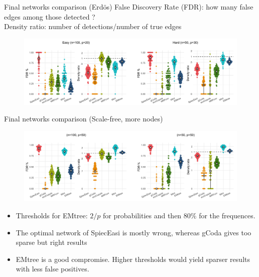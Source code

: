 \documentclass[11pt]{beamer}
\newcommand{\bleu}[1]{\textcolor{Framableulight}{#1}}
\begin{document}
  \begin{frame}{Final networks comparison (Erdös)}
 \small{ \bleu{False Discovery Rate (FDR):} how many false edges among those detected ?\\
  \bleu{Density ratio:} number of detections/number of true edges}\normalsize
 \begin{figure}
 \includegraphics[width=\linewidth]{images/panel_erdos_6methods.png}\\
 \end{figure}
 \end{frame}
  \begin{frame}{Final networks comparison (Scale-free, more nodes)}
  \begin{figure}
 \includegraphics[width=\linewidth]{images/tpfn_sf.png}\\
 \end{figure}
 \small
 \begin{itemize}
 \item Thresholds for EMtree: $2/p$ for probabilities and then $80\%$ for the frequences.
 \item The optimal network of SpiecEasi is mostly wrong, whereas gCoda gives too sparse but right results
 \item EMtree is a good compromise. Higher thresholds would yield sparser results with less false positives.
 \end{itemize}
 \normalsize
 \end{frame}
\end{document}
